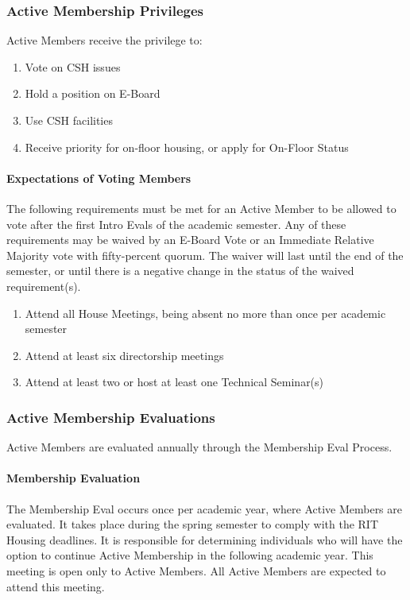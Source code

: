 \documentclass{article}
\newcommand{\asubsection}[1]{\subsubsection{#1} \label{#1}}
\newcommand{\asubsubsection}[1]{\paragraph{#1} \label{#1}}
\begin{document}
\asubsection{Active Membership Privileges}
Active Members receive the privilege to:
\begin{enumerate}
	\item Vote on CSH issues
	\item Hold a position on E-Board
	\item Use CSH facilities
	\item Receive priority for on-floor housing, or apply for On-Floor Status
\end{enumerate}

\asubsubsection{Expectations of Voting Members}
\renewcommand{\theenumi}{\arabic{enumi}} %

The following requirements must be met for an Active Member to be allowed to vote after the first Intro Evals of the academic semester.
Any of these requirements may be waived by an E-Board Vote or an Immediate Relative Majority vote with fifty-percent quorum.
The waiver will last until the end of the semester, or until there is a negative change in the status of the waived requirement(s).
\begin{enumerate}
	\item Attend all House Meetings, being absent no more than once per academic semester
	\item Attend at least six directorship meetings
	\item Attend at least two or host at least one Technical Seminar(s)
\end{enumerate}

\asubsection{Active Membership Evaluations}
Active Members are evaluated annually through the Membership Eval Process.

\asubsubsection{Membership Evaluation}
The Membership Eval occurs once per academic year, where Active Members are evaluated.
It takes place during the spring semester to comply with the RIT Housing deadlines.
It is responsible for determining individuals who will have the option to continue Active Membership in the following academic year.
This meeting is open only to Active Members.
All Active Members are expected to attend this meeting.
\end{document}
